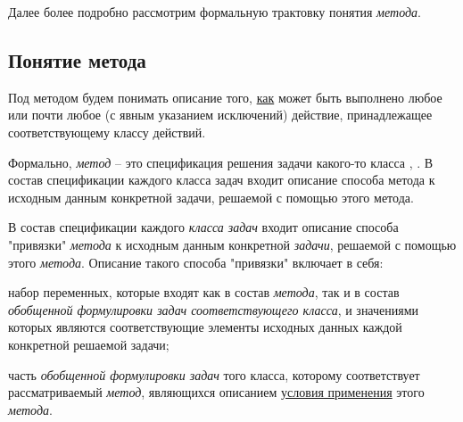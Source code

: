 Далее более подробно рассмотрим формальную трактовку понятия \textit{метода}.

\subsection{Понятие метода}
\label{subsec_method_concept}

Под методом будем понимать описание того, \underline{как} может быть выполнено любое или почти любое (с явным указанием исключений) действие, принадлежащее соответствующему классу действий.

Формально, \textit{метод} -- это спецификация решения задачи какого-то класса \cite{Standard2021}, \cite{Tuzov1986}. В состав спецификации каждого класса задач входит описание способа  метода к исходным данным конкретной задачи, решаемой с помощью этого метода.

\begin{SCn}
\end{SCn}

В состав спецификации каждого \textit{класса задач} входит описание способа "привязки"{} \textit{метода} к исходным данным конкретной \textit{задачи}, решаемой с помощью этого \textit{метода}. Описание такого способа "привязки"{} включает в себя:
\begin{textitemize}
	\item набор переменных, которые входят как в состав \textit{метода}, так и в состав \textit{обобщенной формулировки задач соответствующего класса}, и значениями которых являются соответствующие элементы исходных данных каждой конкретной решаемой задачи;
	\item часть \textit{обобщенной формулировки задач} того класса, которому соответствует рассматриваемый \textit{метод}, являющихся описанием \underline{условия применения} этого \textit{метода}.
\end{textitemize}

